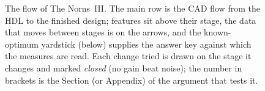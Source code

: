 \begin{figure}[tp]
\centering
\odinfit{\textwidth}{}
\caption{The flow of The Norns~III. The main row is the CAD flow from the HDL to the finished design; features sit above their stage, the data that moves between stages is on the arrows, and the known-optimum yardstick (below) supplies the answer key against which the measures are read. Each change tried is drawn on the stage it changes and marked \emph{closed} (no gain beat noise); the number in brackets is the Section (or Appendix) of the argument that tests it.}
\label{fig:flow}
\end{figure}
